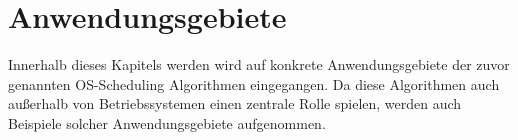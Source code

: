 \chapter{Anwendungsgebiete}
Innerhalb dieses Kapitels werden wird auf konkrete Anwendungsgebiete der zuvor genannten OS-Scheduling Algorithmen eingegangen. Da diese Algorithmen auch außerhalb von Betriebssystemen einen zentrale Rolle spielen, werden auch Beispiele solcher Anwendungsgebiete aufgenommen.

